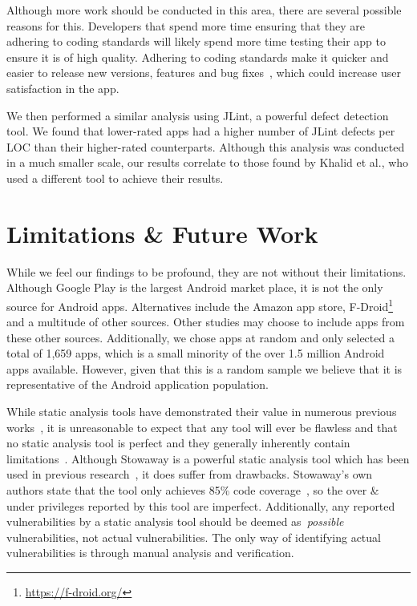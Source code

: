 \documentclass{sig-alternate}
\begin{document}
Although more work should be conducted in this area, there are several possible reasons for this. Developers that spend more time ensuring that they are adhering to coding standards will likely spend more time testing their app to ensure it is of high quality. Adhering to coding standards make it quicker and easier to release new versions, features and bug fixes~\cite{Li:2005:ETC:1095714.1095770, li2006using}, which could increase user satisfaction in the app.

We then performed a similar analysis using JLint, a powerful defect detection tool. We found that lower-rated apps had a higher number of JLint defects per LOC than their higher-rated counterparts. Although this analysis was conducted in a much smaller scale, our results correlate to those found by Khalid et al.\cite{Khalid_Mei_Examinging}, who used a different tool to achieve their results.




\section{Limitations \& Future Work}
\label{sec:limitations}

While we feel our findings to be profound, they are not without their limitations. Although Google Play is the largest Android market place, it is not the only source for Android apps. Alternatives include the Amazon app store, F-Droid\footnote{\url{https://f-droid.org/}} and a multitude of other sources. Other studies may choose to include apps from these other sources. Additionally, we chose apps at random and only selected a total of 1,659 apps, which is a small minority of the over 1.5 million Android apps available. However, given that this is a random sample we believe that it is representative of the Android application population.

While static analysis tools have demonstrated their value in numerous previous works~\cite{Felt:2011:APD:2046707.2046779, Pearce:2012:APS:2414456.2414498}, it is unreasonable to expect that any tool will ever be flawless and that no static analysis tool is perfect and they generally inherently contain limitations~\cite{chess2004static}. Although Stowaway is a powerful static analysis tool which has been used in previous research~\cite{Pearce:2012:APS:2414456.2414498,Stevens_investigatinguser,jeon2011dr}, it does suffer from drawbacks. Stowaway's own authors state that the tool only achieves 85\% code coverage~\cite{Felt:2011:APD:2046707.2046779}, so the over \& under privileges reported by this tool are imperfect. Additionally, any reported vulnerabilities by a static analysis tool should be deemed as~\emph{possible} vulnerabilities, not actual vulnerabilities. The only way of identifying actual vulnerabilities is through manual analysis and verification.
\end{document}
